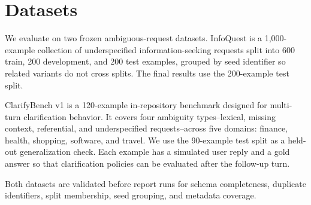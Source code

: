 \section{Datasets}

We evaluate on two frozen ambiguous-request datasets. InfoQuest is a 1,000-example collection of underspecified information-seeking requests split into 600 train, 200 development, and 200 test examples, grouped by seed identifier so related variants do not cross splits. The final results use the 200-example test split.

ClarifyBench v1 is a 120-example in-repository benchmark designed for multi-turn clarification behavior. It covers four ambiguity types--lexical, missing context, referential, and underspecified requests--across five domains: finance, health, shopping, software, and travel. We use the 90-example test split as a held-out generalization check. Each example has a simulated user reply and a gold answer so that clarification policies can be evaluated after the follow-up turn.

Both datasets are validated before report runs for schema completeness, duplicate identifiers, split membership, seed grouping, and metadata coverage.
